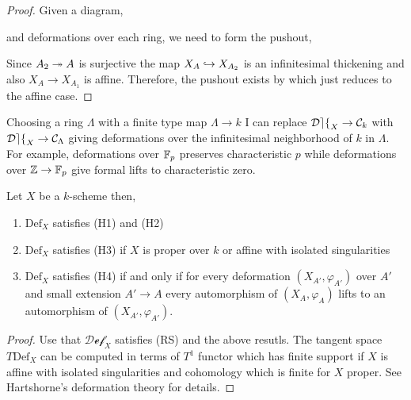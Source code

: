 \documentclass[12pt]{article}
\newcommand{\Def}{\mathrm{Def}}
\newcommand{\cDef}{\mathcal{Def}}
\begin{document}
\begin{proof}
Given a diagram,
\begin{center}
\end{center}
and deformations over each ring, we need to form the pushout,
\begin{center}
\end{center}
Since $A_2 \twoheadrightarrow A$ is surjective the map $X_A \hookrightarrow X_{A_2}$ is an infinitesimal thickening and also $X_{A} \to X_{A_1}$ is affine. Therefore, the pushout exists by  which just reduces to the affine case.
\end{proof}

\begin{rmk}
Choosing a ring $\Lambda$ with a finite type map $\Lambda \to k$ I can replace $\cDef_X \to \C_k$ with $\cDef_X \to \C_\Lambda$ giving deformations over the infinitesimal neighborhood of $k$ in $\Lambda$. For example, deformations over $\mathbb{F}_p$ preserves characteristic $p$ while deformations over $\mathbb{Z} \to \mathbb{F}_p$ give formal lifts to characteristic zero.
\end{rmk}

\begin{prop}
Let $X$ be a $k$-scheme then,
\begin{enumerate}
\item $\Def_X$ satisfies (H1) and (H2)
\item $\Def_X$ satisfies (H3) if $X$ is proper over $k$ or affine with isolated singularities
\item $\Def_X$ satisfies (H4) if and only if for every deformation $(X_{A'}, \varphi_{A'})$ over $A'$ and small extension $A' \to A$ every automorphism of $(X_A, \varphi_A)$ lifts to an automorphism of $(X_{A'}, \varphi_{A'})$.
\end{enumerate}
\end{prop}

\begin{proof}
Use that $\cDef_X$ satisfies (RS) and the above resutls. The tangent space $T \Def_X$ can be computed in terms of $T^1$ functor which has finite support if $X$ is affine with isolated singularities and cohomology which is finite for $X$ proper. See Hartshorne's deformation theory for details.
\end{proof}
\end{document}
